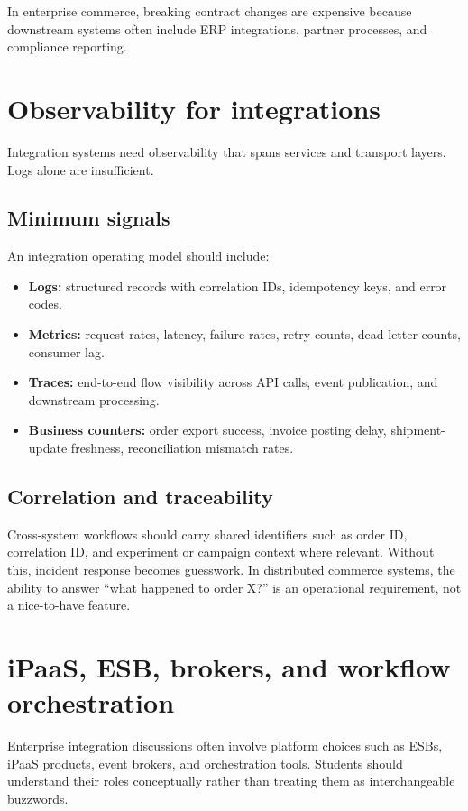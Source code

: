 In enterprise commerce, breaking contract changes are expensive because downstream systems often include ERP integrations, partner processes, and compliance reporting.

\section{Observability for integrations}
Integration systems need observability that spans services and transport layers.
Logs alone are insufficient.

\subsection{Minimum signals}
An integration operating model should include:
\begin{itemize}
  \item \textbf{Logs:} structured records with correlation IDs, idempotency keys, and error codes.
  \item \textbf{Metrics:} request rates, latency, failure rates, retry counts, dead-letter counts, consumer lag.
  \item \textbf{Traces:} end-to-end flow visibility across API calls, event publication, and downstream processing.
  \item \textbf{Business counters:} order export success, invoice posting delay, shipment-update freshness, reconciliation mismatch rates.
\end{itemize}

\subsection{Correlation and traceability}
Cross-system workflows should carry shared identifiers such as order ID, correlation ID, and experiment or campaign context where relevant.
Without this, incident response becomes guesswork.
In distributed commerce systems, the ability to answer ``what happened to order X?'' is an operational requirement, not a nice-to-have feature.

\section{iPaaS, ESB, brokers, and workflow orchestration}
Enterprise integration discussions often involve platform choices such as ESBs, iPaaS products, event brokers, and orchestration tools.
Students should understand their roles conceptually rather than treating them as interchangeable buzzwords.

